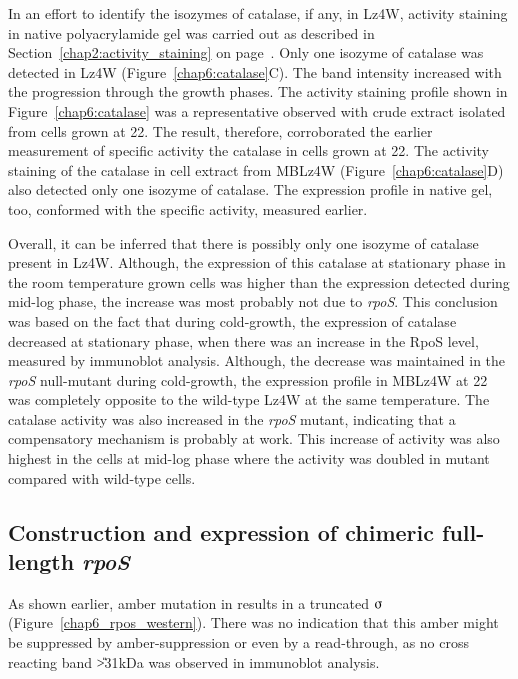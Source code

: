 In an effort to identify the isozymes of catalase, if any, in
Lz4W, activity staining in native polyacrylamide gel was carried
out as described in Section~\ref{chap2:activity_staining} on
page~\pageref{chap2:activity_staining}. Only one isozyme of
catalase was detected in Lz4W (Figure~\ref{chap6:catalase}C). The
band intensity increased with the progression through the growth
phases. The activity staining profile shown in
Figure~\ref{chap6:catalase} was a representative observed with
crude extract isolated from cells grown at 22\dg{}\@. The result,
therefore, corroborated the earlier measurement of specific
activity the catalase in cells grown at 22\dg{}\@. The activity
staining of the catalase in cell extract from MBLz4W
(Figure~\ref{chap6:catalase}D) also detected only one isozyme of
catalase. The expression profile in native gel, too, conformed
with the specific activity, measured earlier.

Overall, it can be inferred that there is possibly only one
isozyme of catalase present in Lz4W. Although, the expression of
this catalase at stationary phase in the room temperature grown
cells was higher than the expression detected during mid-log
phase, the increase was most probably not due to \emph{rpoS}. This
conclusion was based on the fact that during cold-growth, the
expression of catalase decreased at stationary phase, when there
was an increase in the RpoS level, measured by immunoblot
analysis. Although, the decrease was maintained in the \emph{rpoS}
null-mutant during cold-growth, the expression profile in MBLz4W
at 22\dg{} was completely opposite to the wild-type Lz4W at the
same temperature. The catalase activity was also increased in the
\emph{rpoS} mutant, indicating that a compensatory mechanism is
probably at work. This increase of activity was also highest in
the cells at mid-log phase where the activity was doubled in
mutant compared with wild-type cells.

\subsection{Construction and expression of chimeric full-length \emph{rpoS}}

As shown earlier, amber mutation in \lzsig{} results in a
truncated $\sigmaup$ (Figure~\ref{chap6_rpos_western}).
There was no indication that this amber might be suppressed by
amber-suppression or even by a read-through, as no cross reacting
band \U{>31}{kDa} was observed in immunoblot analysis.


